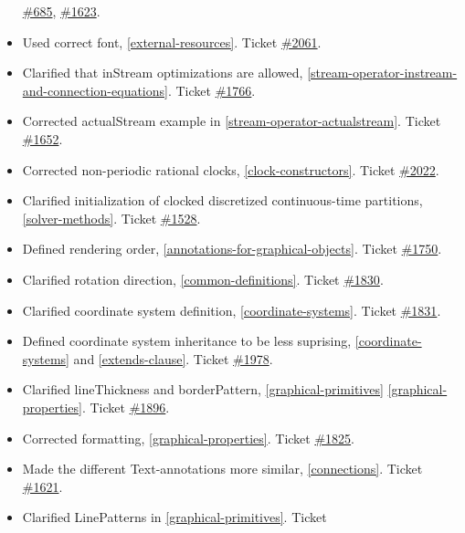 \begin{itemize}
  \href{https://trac.modelica.org/Modelica/ticket/685}{\#685},
  \href{https://trac.modelica.org/Modelica/ticket/1623}{\#1623}.
\item
  Used correct font, \autoref{external-resources}. Ticket
  \href{https://trac.modelica.org/Modelica/ticket/2061}{\#2061}.
\item
  Clarified that inStream optimizations are allowed, \autoref{stream-operator-instream-and-connection-equations}.
  Ticket \href{https://trac.modelica.org/Modelica/ticket/1766}{\#1766}.
\item
  Corrected actualStream example in \autoref{stream-operator-actualstream}. Ticket
  \href{https://trac.modelica.org/Modelica/ticket/1652}{\#1652}.
\item
  Corrected non-periodic rational clocks, \autoref{clock-constructors}. Ticket
  \href{https://trac.modelica.org/Modelica/ticket/2022}{\#2022}.
\item
  Clarified initialization of clocked discretized continuous-time
  partitions, \autoref{solver-methods}. Ticket
  \href{https://trac.modelica.org/Modelica/ticket/1528}{\#1528}.
\item
  Defined rendering order, \autoref{annotations-for-graphical-objects}. Ticket
  \href{https://trac.modelica.org/Modelica/ticket/1750}{\#1750}.
\item
  Clarified rotation direction, \autoref{common-definitions}. Ticket
  \href{https://trac.modelica.org/Modelica/ticket/1830}{\#1830}.
\item
  Clarified coordinate system definition, \autoref{coordinate-systems}. Ticket
  \href{https://trac.modelica.org/Modelica/ticket/1831}{\#1831}.
\item
  Defined coordinate system inheritance to be less suprising, 
  \autoref{coordinate-systems} and \autoref{extends-clause}. Ticket
  \href{https://trac.modelica.org/Modelica/ticket/1978}{\#1978}.
\item
  Clarified lineThickness and borderPattern, \autoref{graphical-primitives} \autoref{graphical-properties}.
  Ticket \href{https://trac.modelica.org/Modelica/ticket/1896}{\#1896}.
\item
  Corrected formatting, \autoref{graphical-properties}. Ticket
  \href{https://trac.modelica.org/Modelica/ticket/1825}{\#1825}.
\item
  Made the different Text-annotations more similar, \autoref{connections}.
  Ticket \href{https://trac.modelica.org/Modelica/ticket/1621}{\#1621}.
\item
  Clarified LinePatterns in \autoref{graphical-primitives}. Ticket

\end{itemize}
